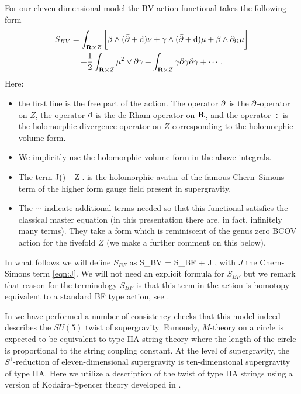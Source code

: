 \documentclass[../main.tex]{subfiles}
\begin{document}
For our eleven-dimensional model the BV action functional takes the following form
\begin{multline}
S_{BV} = \int_{\mathbf{R} \times Z} \bigg[\beta \wedge (\bar{\partial} + \mathrm{d}) \nu + \gamma \wedge (\bar{\partial} + \mathrm{d}) \mu +  \beta \wedge \partial_{\Omega} \mu  \bigg] \\
+ \frac{1}{2} \int_{\mathbf{R} \times Z}  \mu^2 \vee \partial \gamma + \int_{\mathbf{R} \times Z} \gamma \partial \gamma \partial \gamma + \cdots .
\end{multline}
Here:
\begin{itemize}
\item the first line is the free part of the action.
The operator $\bar{\partial}$ is the $\bar{\partial}$-operator on $Z$, the operator $\mathrm{d}$ is the de Rham operator on $\mathbf{R}$, and the operator $\div$ is the holomorphic divergence operator on $Z$ corresponding to the holomorphic volume form.
\item We implicitly use the holomorphic volume form in the above integrals.
\item The term 
\beqn\label{eqn:J}
J(\gamma)  \int_{\R \times Z} \gamma \del \gamma \del \gamma .
\eeqn
is the holomorphic avatar of the famous Chern--Simons term of the higher form gauge field present in supergravity.
\item The $\cdots$ indicate additional terms needed so that this functional satisfies the classical master equation (in this presentation there are, in fact, infinitely many terms).
They take a form which is reminiscent of the genus zero BCOV action for the fivefold $Z$ (we make a further comment on this below).
\end{itemize}

In what follows we will define $S_{BF}$ as
\beqn
S_{BV} = S_{BF} + J ,
\eeqn
with $J$ the Chern-Simons term \eqref{eqn:J}.
We will not need an explicit formula for $S_{BF}$ but we remark that reason for the terminology $S_{BF}$ is that this term in the action is homotopy equivalent to a standard BF type action, see \cite{RSW}.

In \cite{RSW} we have performed a number of consistency checks that this model indeed describes the $SU(5)$ twist of supergravity.
Famously, $M$-theory on a circle is expected to be equivalent to type IIA string theory where the length of the circle is proportional to the string coupling constant.
At the level of supergravity, the $S^1$-reduction of eleven-dimensional supergravity is ten-dimensional supergravity of type IIA.
Here we utilize a description of the twist of type IIA strings using a version of Kodaira--Spencer theory developed in \cite{CLbcov1,CLsugra}.
\end{document}
